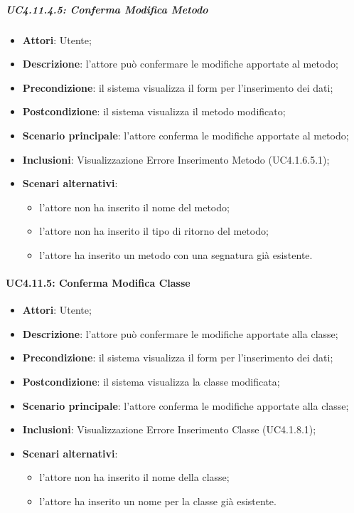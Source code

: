 \begin{itemize}
\begin{itemize}
\begin{itemize}
\begin{itemize}
\subparagraph{UC4.11.4.5: Conferma Modifica Metodo}
\label{UC4.11.4.5}
\begin{itemize}
	\item \textbf{Attori}: Utente;
	\item \textbf{Descrizione}: l'attore può confermare le modifiche apportate al metodo;
	\item \textbf{Precondizione}: il sistema visualizza il form per l'inserimento dei dati;
	\item \textbf{Postcondizione}: il sistema visualizza il metodo modificato;
	\item \textbf{Scenario principale}: l'attore conferma le modifiche apportate al metodo;
	\item \textbf{Inclusioni}:
	Visualizzazione Errore Inserimento Metodo (UC4.1.6.5.1);
	\item \textbf{Scenari alternativi}:
	\begin{itemize}
		\item l'attore non ha inserito il nome del metodo;
		\item l'attore non ha inserito il tipo di ritorno del metodo;
		\item l'attore ha inserito un metodo con una segnatura già esistente.
	\end{itemize}
\end{itemize}

\paragraph{UC4.11.5: Conferma Modifica Classe}
\label{UC4.11.5}
\begin{itemize}
	\item \textbf{Attori}: Utente;
	\item \textbf{Descrizione}: l'attore può confermare le modifiche apportate alla classe;
	\item \textbf{Precondizione}: il sistema visualizza il form per l'inserimento dei dati;
	\item \textbf{Postcondizione}: il sistema visualizza la classe modificata;
	\item \textbf{Scenario principale}: l'attore conferma le modifiche apportate alla classe;
	\item \textbf{Inclusioni}:
	Visualizzazione Errore Inserimento Classe (UC4.1.8.1);
	\item \textbf{Scenari alternativi}:
	\begin{itemize}
		\item l'attore non ha inserito il nome della classe;
		\item l'attore ha inserito un nome per la classe già esistente.
	\end{itemize}
\end{itemize}


\end{itemize}
\end{itemize}
\end{itemize}
\end{itemize}
